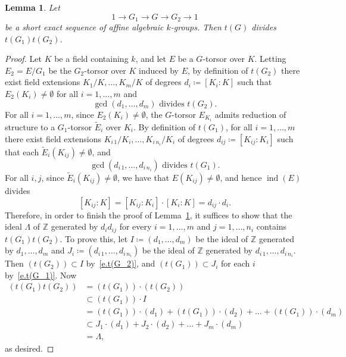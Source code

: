 \documentclass[12pt]{amsart}
\numberwithin{equation}{section}
\newtheorem{lemma}[theorem]{Lemma}
\theoremstyle{remark}
\newcommand{\ind}{\operatorname{ind}}
\begin{document}
\begin{lemma} \label{lem.t(G)}
Let 
\[1 \longrightarrow G_1 \longrightarrow G \longrightarrow G_2 \longrightarrow 1\] be a short exact sequence of affine algebraic $k$-groups. Then $t(G)$ divides $t(G_1) t(G_2)$.
\end{lemma}

\begin{proof} Let $K$ be a field containing $k$, and let $E$ be a $G$-torsor over $K$.  
Letting $E_2=E/G_1$ be the $G_2$-torsor over $K$ induced by $E$, by definition of $t(G_2)$ there exist field extensions $K_1/K, \ldots, K_m/K$ of degrees $d_i\coloneqq [K_i : K]$ such that $E_2(K_i)\neq\emptyset$ for all $i=1,\dots,m$ and 
\begin{equation} \label{e.t(G_2)}
\text{$\gcd(d_1, \ldots, d_m)$ divides $t(G_2)$.}
\end{equation}
For all $i=1,\dots,m$, since $E_2(K_i)\neq\emptyset$, the $G$-torsor $E_{K_i}$ admits reduction of structure to a $G_1$-torsor $\tilde{E}_i$ over $K_i$. By definition of $t(G_1)$, for all $i = 1, \ldots, m$ there exist field extensions $K_{i\, 1}/K_i, \ldots, K_{i\,n_i}/K_i$ of degrees $d_{ij} \coloneqq [K_{ij}: K_i]$ such that each $\tilde{E}_i(K_{ij})\neq\emptyset$, and
\begin{equation} \label{e.t(G_1)}
\text{$\gcd(d_{i\, 1}, \ldots, d_{i\, n_i})$ divides $t(G_1)$.}
\end{equation} 
For all $i,j$, since $\tilde{E}_i(K_{ij})\neq\emptyset$, we have that $E(K_{ij})\neq\emptyset$, and hence $\ind(E)$ divides  
\[ [K_{ij}: K] = [K_{ij}: K_i] \cdot [K_i: K] = d_{ij} \cdot d_i.\]
Therefore, in order to finish the proof of Lemma~\ref{lem.t(G)}, it suffices to show that the ideal $\Lambda$ of $\mathbb Z$ generated by $d_i d_{ij}$ for every $i = 1, \ldots, m$ and $j = 1, \ldots, n_i$ contains $t(G_1) t(G_2)$. To prove this, let $I \coloneqq (d_1, \ldots, d_m) $ be the ideal of $\mathbb Z$ generated by $d_1, \ldots, d_m$ and $J_i \coloneqq (d_{i\, 1}, \ldots, d_{i\, n_i})$ be the ideal of $\mathbb Z$ generated by $d_{i\, 1}, \ldots, d_{i\, n_i}$. Then $(t(G_2)) \subset I$ by~\eqref{e.t(G_2)}, and $(t(G_1)) \subset J_i$ for each $i$  by~\eqref{e.t(G_1)}. Now
\begin{align*}
(t(G_1)t(G_2))
&= (t(G_1)) \cdot (t(G_2)) \\
&\subset (t(G_1)) \cdot I \\
&= (t(G_1)) \cdot (d_1) + (t(G_1)) \cdot (d_2) + \ldots
   + (t(G_1)) \cdot (d_m) \\
&\subset J_1 \cdot (d_1) + J_2 \cdot (d_2) + \ldots + J_m \cdot (d_m) \\
&= \Lambda,
\end{align*}
as desired.     
\end{proof}
\end{document}
